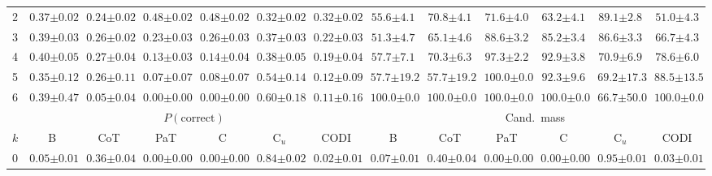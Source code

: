 \begin{table}[!t]
\begin{tabular}{l cccccc cccccc}
2 & $0.37 {\scriptstyle \pm 0.02}$ & $0.24 {\scriptstyle \pm 0.02}$ & $0.48 {\scriptstyle \pm 0.02}$ & $0.48 {\scriptstyle \pm 0.02}$ & $0.32 {\scriptstyle \pm 0.02}$ & $0.32 {\scriptstyle \pm 0.02}$ & $55.6 {\scriptstyle \pm 4.1}$ & $70.8 {\scriptstyle \pm 4.1}$ & $71.6 {\scriptstyle \pm 4.0}$ & $63.2 {\scriptstyle \pm 4.1}$ & $89.1 {\scriptstyle \pm 2.8}$ & $51.0 {\scriptstyle \pm 4.3}$ \\
3 & $0.39 {\scriptstyle \pm 0.03}$ & $0.26 {\scriptstyle \pm 0.02}$ & $0.23 {\scriptstyle \pm 0.03}$ & $0.26 {\scriptstyle \pm 0.03}$ & $0.37 {\scriptstyle \pm 0.03}$ & $0.22 {\scriptstyle \pm 0.03}$ & $51.3 {\scriptstyle \pm 4.7}$ & $65.1 {\scriptstyle \pm 4.6}$ & $88.6 {\scriptstyle \pm 3.2}$ & $85.2 {\scriptstyle \pm 3.4}$ & $86.6 {\scriptstyle \pm 3.3}$ & $66.7 {\scriptstyle \pm 4.3}$ \\
4 & $0.40 {\scriptstyle \pm 0.05}$ & $0.27 {\scriptstyle \pm 0.04}$ & $0.13 {\scriptstyle \pm 0.03}$ & $0.14 {\scriptstyle \pm 0.04}$ & $0.38 {\scriptstyle \pm 0.05}$ & $0.19 {\scriptstyle \pm 0.04}$ & $57.7 {\scriptstyle \pm 7.1}$ & $70.3 {\scriptstyle \pm 6.3}$ & $97.3 {\scriptstyle \pm 2.2}$ & $92.9 {\scriptstyle \pm 3.8}$ & $70.9 {\scriptstyle \pm 6.9}$ & $78.6 {\scriptstyle \pm 6.0}$ \\
5 & $0.35 {\scriptstyle \pm 0.12}$ & $0.26 {\scriptstyle \pm 0.11}$ & $0.07 {\scriptstyle \pm 0.07}$ & $0.08 {\scriptstyle \pm 0.07}$ & $0.54 {\scriptstyle \pm 0.14}$ & $0.12 {\scriptstyle \pm 0.09}$ & $57.7 {\scriptstyle \pm 19.2}$ & $57.7 {\scriptstyle \pm 19.2}$ & $100.0 {\scriptstyle \pm 0.0}$ & $92.3 {\scriptstyle \pm 9.6}$ & $69.2 {\scriptstyle \pm 17.3}$ & $88.5 {\scriptstyle \pm 13.5}$ \\
6 & $0.39 {\scriptstyle \pm 0.47}$ & $0.05 {\scriptstyle \pm 0.04}$ & $0.00 {\scriptstyle \pm 0.00}$ & $0.00 {\scriptstyle \pm 0.00}$ & $0.60 {\scriptstyle \pm 0.18}$ & $0.11 {\scriptstyle \pm 0.16}$ & $100.0 {\scriptstyle \pm 0.0}$ & $100.0 {\scriptstyle \pm 0.0}$ & $100.0 {\scriptstyle \pm 0.0}$ & $100.0 {\scriptstyle \pm 0.0}$ & $66.7 {\scriptstyle \pm 50.0}$ & $100.0 {\scriptstyle \pm 0.0}$ \\
\midrule
 & \multicolumn{6}{c}{$P(\text{correct})$} & \multicolumn{6}{c}{Cand.\ mass} \\
\cmidrule(lr){2-7} \cmidrule(lr){8-13}
$k$ & B & CoT & PaT & C & C$_u$ & CODI & B & CoT & PaT & C & C$_u$ & CODI \\
\midrule
0 & $0.05 {\scriptstyle \pm 0.01}$ & $0.36 {\scriptstyle \pm 0.04}$ & $0.00 {\scriptstyle \pm 0.00}$ & $0.00 {\scriptstyle \pm 0.00}$ & $0.84 {\scriptstyle \pm 0.02}$ & $0.02 {\scriptstyle \pm 0.01}$ & $0.07 {\scriptstyle \pm 0.01}$ & $0.40 {\scriptstyle \pm 0.04}$ & $0.00 {\scriptstyle \pm 0.00}$ & $0.00 {\scriptstyle \pm 0.00}$ & $0.95 {\scriptstyle \pm 0.01}$ & $0.03 {\scriptstyle \pm 0.01}$ \\

\end{tabular}
\end{table}
